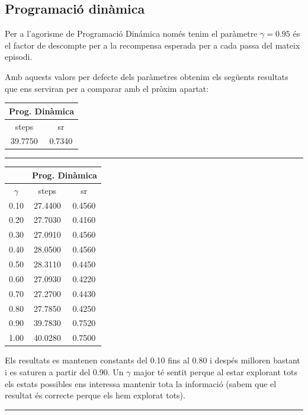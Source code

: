 \documentclass[12pt,a4paper]{report}
\begin{document}
\subsection{Programació dinàmica}

Per a l'agorisme de Programació Dinámica només tenim el paràmetre $\gamma = 0.95$ és el factor de descompte per a la recompensa esperada per a cada passa del mateix episodi.

Amb aquests valors per defecte dels paràmetres obtenim els següents resultats que ens serviran per a comparar
amb el pròxim apartat:

\begin{table}[H]
  \centering
  \begin{tabular}{| c c |}
    \hline
    \multicolumn{2}{|c|}{Prog. Dinàmica} \\
    \hline
    steps & sr \\
    \hline
    39.7750 & 0.7340 \\
    \hline
  \end{tabular}
\end{table}

\vspace*{10pt}\hrule

\begin{minipage}{0.3\textwidth}
  \centering
  \begin{tabular}{| c | c c |}
    \hline
      & \multicolumn{2}{|c|}{Prog. Dinàmica} \\
    \hline
    $\gamma$ & steps & sr \\
    \hline
    0.10 & 27.4400 & 0.4560 \\
    0.20 & 27.7030 & 0.4160 \\
    0.30 & 27.0910 & 0.4560 \\
    0.40 & 28.0500 & 0.4560 \\
    0.50 & 28.3110 & 0.4450 \\
    0.60 & 27.0930 & 0.4220 \\
    0.70 & 27.2700 & 0.4430 \\
    0.80 & 27.7850 & 0.4250 \\
    0.90 & 39.7830 & 0.7520 \\
    1.00 & 40.0280 & 0.7500 \\
    \hline
  \end{tabular}
\end{minipage}
\hfill
\begin{minipage}{0.5\textwidth}
  Els resultats es mantenen constants del 0.10 fins al 0.80 i despés milloren bastant i es saturen a partir del 0.90.
  Un $\gamma$ major té sentit perque al estar explorant tots els estats possibles ens interessa
  mantenir tota la informació (sabem que el resultat és correcte perque els hem explorat tots).
\end{minipage}
\vspace*{10pt}\hrule
\end{document}
